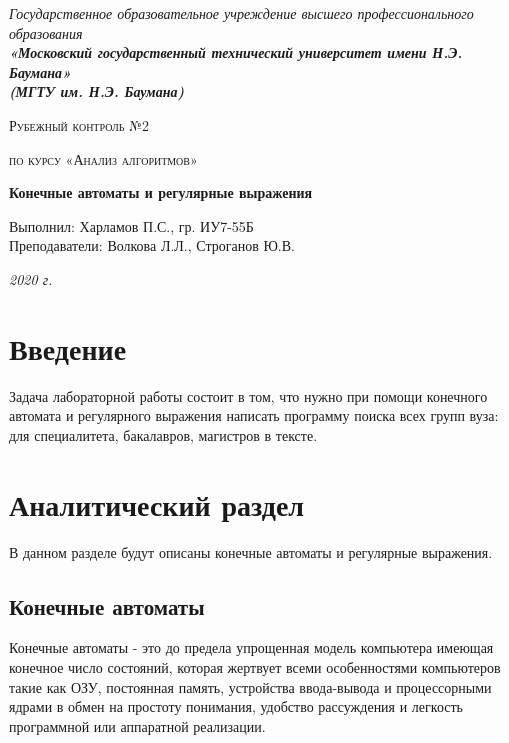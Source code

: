 \documentclass[12pt, a4paper]{report}
\begin{document}
    \begin{titlepage}

        \begin{center}
            \Large
            {\sl Государственное образовательное учреждение высшего профессионального образования\\
            {\bf«Московский государственный технический университет имени Н.Э. Баумана»\\
				(МГТУ им. Н.Э. Баумана)}}
            \vspace{3cm}

			{\scshape\LARGE Рубежный контроль №2 \par}
			\vspace{0.5cm}	
			{\scshape\LARGE по курсу «Анализ алгоритмов» \par}
			\vspace{1.5cm}
			{\huge\bfseries Конечные автоматы и регулярные выражения \par}
			\vspace{2cm}
			\Large Выполнил: Харламов П.С., гр. ИУ7-55Б\\
			\vspace{0.5cm}
			{\Large Преподаватели: Волкова Л.Л., Строганов Ю.В.}
		
			\vfill
			\Large \textit {2020 г.}
            
        \end{center}

    \end{titlepage}
	
	\tableofcontents

	\chapter*{Введение}
	
	Задача лабораторной работы состоит в том, что нужно при помощи конечного автомата и регулярного выражения написать программу поиска всех групп вуза: для специалитета, бакалавров, магистров в тексте.
	

    \chapter{Аналитический раздел}
   	\vspace{-0.5cm}В данном разделе будут описаны конечные автоматы и регулярные выражения.
	\section{Конечные автоматы}
	Конечные автоматы - это до предела упрощенная модель компьютера имеющая конечное число состояний, которая жертвует всеми особенностями компьютеров такие как ОЗУ, постоянная память, устройства ввода-вывода и процессорными ядрами в обмен на простоту понимания, удобство рас­суждения и легкость программной или аппаратной реализации\cite{fsm}.
	
\end{document}
